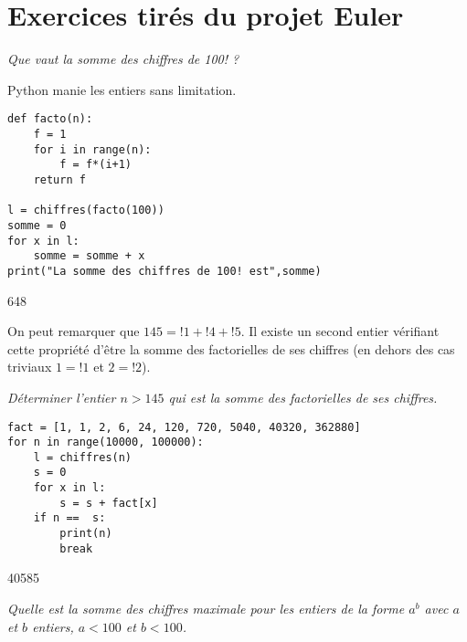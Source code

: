 \section{Exercices tirés du projet Euler}
\begin{Exercise}[title={Projet Euler 20}]\it
Que vaut la somme des chiffres de 100! ?

Python manie les entiers sans limitation.
\end{Exercise}
\begin{Answer}
\begin{lstlisting}
def facto(n):
    f = 1
    for i in range(n):
        f = f*(i+1)
    return f
    
l = chiffres(facto(100))
somme = 0
for x in l:
    somme = somme + x
print("La somme des chiffres de 100! est",somme)
\end{lstlisting}
648
\end{Answer}
On peut remarquer que $145 = !1+!4+!5$. Il existe un second entier vérifiant cette propriété d'être la somme des factorielles de ses chiffres (en dehors des cas triviaux $1 = !1$ et $2=!2$).
\begin{Exercise}[title = {Projet Euler 34}]\it 
Déterminer l'entier $n> 145$ qui est la somme des factorielles de ses chiffres.
\end{Exercise}
\begin{Answer}
\begin{lstlisting}
fact = [1, 1, 2, 6, 24, 120, 720, 5040, 40320, 362880]
for n in range(10000, 100000):
    l = chiffres(n)
    s = 0
    for x in l:
        s = s + fact[x]
    if n ==  s:
        print(n)
        break
\end{lstlisting}
40585
\end{Answer}
\begin{Exercise}[title = {Projet Euler 56}]\it 
Quelle est la somme des chiffres maximale pour les entiers de la forme $a^b$ avec $a$ et $b$ entiers, $a< 100$ et $b < 100$. 
\end{Exercise}
